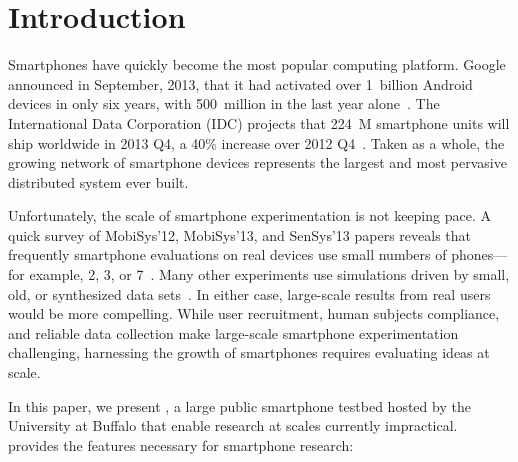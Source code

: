 \section{Introduction}
\label{sec-introduction}

Smartphones have quickly become the most popular computing platform. Google
announced in September, 2013, that it had activated over 1~billion Android
devices in only six years, with 500~million in the last year
alone~\cite{google-total-activations}. The International Data Corporation
(IDC) projects that 224~M smartphone units will ship worldwide in 2013 Q4, a
40\% increase over 2012 Q4~\cite{idc-smartphone-growth}. Taken as a whole,
the growing network of smartphone devices represents the largest and most
pervasive distributed system ever built.

Unfortunately, the scale of smartphone experimentation is not keeping pace. A
quick survey of MobiSys'12, MobiSys'13, and SenSys'13 papers reveals that
frequently smartphone evaluations on real devices use small numbers of
phones---for example, 2, 3, or 7~\cite{nowar-mobisys12, wang:mobisys:2013,
hao:sensys:2013}. Many other experiments use simulations driven by small,
old, or synthesized data sets~\cite{falcon-mobisys12, ace-mobisys12,
humanmobility-mobisys12}. In either case, large-scale results from real users
would be more compelling. While user recruitment, human subjects compliance,
and reliable data collection make large-scale smartphone experimentation
challenging, harnessing the growth of smartphones requires evaluating ideas
at scale.

In this paper, we present \PhoneLab{}, a large public smartphone testbed
hosted by the University at Buffalo that enable research at scales currently
impractical. \PhoneLab{} provides the features necessary for smartphone
research:

